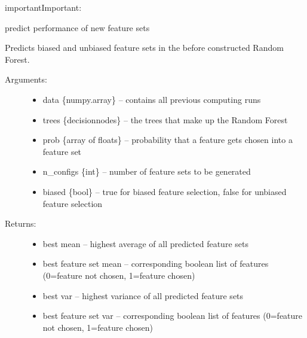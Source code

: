 \documentclass[letterpaper,10pt,english]{sphinxmanual}
\begin{document}
\begin{sphinxadmonition}{important}{Important:}
\begin{fulllineitems}
\end{fulllineitems}

\label{\detokenize{RF:forest-predict}}

\begin{fulllineitems}
\label{\detokenize{RF:ForestFire.Main.forest_predict}}
predict performance of new feature sets

Predicts biased and unbiased feature sets in the before constructed Random Forest.
\begin{description}
\item[{Arguments:}] \leavevmode\begin{itemize}
\item {} 
data \{numpy.array\} -- contains all previous computing runs

\item {} 
trees \{decisionnodes\} -- the trees that make up the Random Forest

\item {} 
prob \{array of floats\} -- probability that a feature gets chosen into a feature set

\item {} 
n\_configs \{int\} -- number of feature sets to be generated

\item {} 
biased \{bool\} -- true for biased feature selection, false for unbiased feature selection

\end{itemize}

\item[{Returns:}] \leavevmode\begin{itemize}
\item {} 
best mean -- highest average of all predicted feature sets

\item {} 
best feature set mean -- corresponding boolean list of features (0=feature not chosen, 1=feature chosen)

\item {} 
best var -- highest variance of all predicted feature sets

\item {} 
best feature set var -- corresponding boolean list of features (0=feature not chosen, 1=feature chosen)

\end{itemize}

\end{description}

\end{fulllineitems}

\end{sphinxadmonition}
\label{\detokenize{RF:blank}}\begin{figure}[htbp]
\centering

\noindent{}
\label{\detokenize{RF:blank}}\end{figure}
\end{document}
